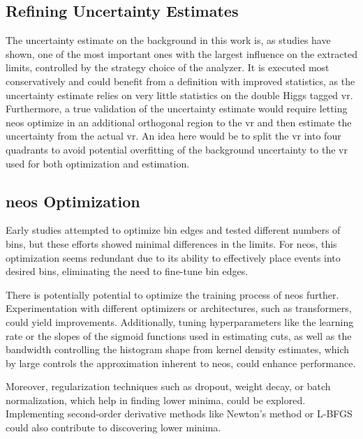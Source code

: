 \subsection{Refining Uncertainty Estimates}
The uncertainty estimate on the background in this work is, as studies have shown, one of the most important ones with the largest influence on the extracted limits, controlled by the strategy choice of the analyzer. It is executed most conservatively and could benefit from a definition with improved statistics, as the uncertainty estimate relies on very little statistics on the double Higgs tagged \ac{vr}. Furthermore, a true validation of the uncertainty estimate would require letting \ac{neos} optimize in an additional orthogonal region to the \ac{vr} and then estimate the uncertainty from the actual \ac{vr}. An idea here would be to split the \ac{vr} into four quadrants to avoid potential overfitting of the background uncertainty to the \ac{vr} used for both optimization and estimation.


\subsection{\ac{neos} Optimization}
Early studies attempted to optimize bin edges and tested different numbers of bins, but these efforts showed minimal differences in the limits. For \ac{neos}, this optimization seems redundant due to its ability to effectively place events into desired bins, eliminating the need to fine-tune bin edges.

There is potentially potential to optimize the training process of \ac{neos} further. Experimentation with different optimizers or architectures, such as transformers, could yield improvements. Additionally, tuning hyperparameters like the learning rate or the slopes of the sigmoid functions used in estimating cuts, as well as the bandwidth controlling the histogram shape from kernel density estimates, which by large controls the approximation inherent to \ac{neos}, could enhance performance.

Moreover, regularization techniques such as dropout, weight decay, or batch normalization, which help in finding lower minima, could be explored. Implementing second-order derivative methods like Newton's method or L-BFGS could also contribute to discovering lower minima.

